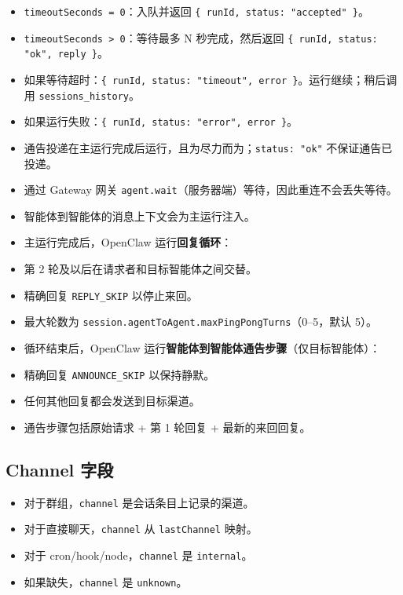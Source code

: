 \begin{itemize}
  \item \texttt{timeoutSeconds = 0}：入队并返回 \texttt{\{ runId, status: "accepted" \}}。
  \item \texttt{timeoutSeconds > 0}：等待最多 N 秒完成，然后返回 \texttt{\{ runId, status: "ok", reply \}}。
  \item 如果等待超时：\texttt{\{ runId, status: "timeout", error \}}。运行继续；稍后调用 \texttt{sessions\_history}。
  \item 如果运行失败：\texttt{\{ runId, status: "error", error \}}。
  \item 通告投递在主运行完成后运行，且为尽力而为；\texttt{status: "ok"} 不保证通告已投递。
  \item 通过 Gateway 网关 \texttt{agent.wait}（服务器端）等待，因此重连不会丢失等待。
  \item 智能体到智能体的消息上下文会为主运行注入。
  \item 主运行完成后，OpenClaw 运行\textbf{回复循环}：
  \item 第 2 轮及以后在请求者和目标智能体之间交替。
  \item 精确回复 \texttt{REPLY\_SKIP} 以停止来回。
  \item 最大轮数为 \texttt{session.agentToAgent.maxPingPongTurns}（0–5，默认 5）。
  \item 循环结束后，OpenClaw 运行\textbf{智能体到智能体通告步骤}（仅目标智能体）：
  \item 精确回复 \texttt{ANNOUNCE\_SKIP} 以保持静默。
  \item 任何其他回复都会发送到目标渠道。
  \item 通告步骤包括原始请求 + 第 1 轮回复 + 最新的来回回复。
\end{itemize}


\subsection{Channel 字段}


\begin{itemize}
  \item 对于群组，\texttt{channel} 是会话条目上记录的渠道。
  \item 对于直接聊天，\texttt{channel} 从 \texttt{lastChannel} 映射。
  \item 对于 cron/hook/node，\texttt{channel} 是 \texttt{internal}。
  \item 如果缺失，\texttt{channel} 是 \texttt{unknown}。
\end{itemize}


